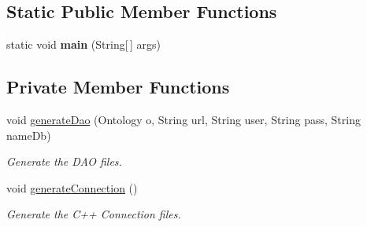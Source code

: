 \subsection*{Static Public Member Functions}
\begin{DoxyCompactItemize}
\item 
\hypertarget{class_gui_a147fb18eb48c8635f144795b1b3f79ad}{
static void {\bfseries main} (String\mbox{[}$\,$\mbox{]} args)}
\label{class_gui_a147fb18eb48c8635f144795b1b3f79ad}

\end{DoxyCompactItemize}
\subsection*{Private Member Functions}
\begin{DoxyCompactItemize}
\item 
void \hyperlink{class_gui_a328763db8d277612d5855a8ee4894cb1}{generateDao} (Ontology o, String url, String user, String pass, String nameDb)
\begin{DoxyCompactList}\small\item\em Generate the DAO files. \end{DoxyCompactList}\item 
\hypertarget{class_gui_a8a2287b6f261d3a0316cee677a2c156f}{
void \hyperlink{class_gui_a8a2287b6f261d3a0316cee677a2c156f}{generateConnection} ()}
\label{class_gui_a8a2287b6f261d3a0316cee677a2c156f}

\begin{DoxyCompactList}\small\item\em Generate the C++ Connection files. \end{DoxyCompactList}\end{DoxyCompactItemize}
